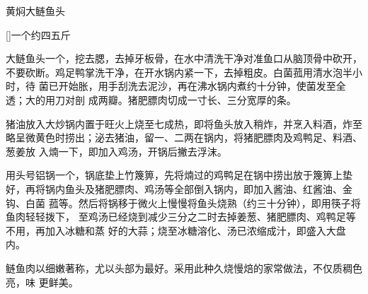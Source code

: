 \begin{recipe}{黄焖大鲢鱼头}

\ingredients

[\footnotemark]{一个约四五斤}

\preparation

\step 大鲢鱼头一个，挖去腮，去掉牙板骨，在水中清洗干净对准鱼口从脑顶骨中砍开，
不要砍断。鸡足鸭掌洗干净，在开水锅内紧一下，去掉粗皮。白菌菰用清水泡半小时，待
菌已开始胀，用手刮洗去泥沙，再在沸水锅内煮约十分钟，使菌发至全透；大的用刀对剖
成两瓣。猪肥膘肉切成一寸长、三分宽厚的条。

\step 猪油放入大炒锅内置于旺火上烧至七成热，即将鱼头放入稍炸，并烹入料酒，炸至
略呈微黄色时捞出；泌去猪油，留一、二两在锅内，将猪肥膘肉及鸡鸭足、料酒、葱姜放
入煵一下，即加入鸡汤，开锅后撇去浮沫。

\step 用头号铝锅一个，锅底垫上竹篾箅，先将煵过的鸡鸭足在锅中捞出放于篾箅上垫
好，再将锅内鱼头及猪肥膘肉、鸡汤等全部倒入锅内，即加入酱油、红酱油、金钩、白菌
菰等。然后将锅移于微火上慢慢将鱼头烧熟（约三十分钟），即用筷子将鱼肉轻轻拨下，
至鸡汤已经烧到减少三分之二时去掉姜葱、猪肥膘肉、鸡鸭足等不用，再加入冰糖和蒸
好的大蒜；烧至冰糖溶化、汤已浓缩成汁，即盛入大盘内。

\features

鲢鱼肉以细嫩著称，尤以头部为最好。采用此种久烧慢焙的家常做法，不仅质稠色亮，味
更鲜美。


\end{recipe}

